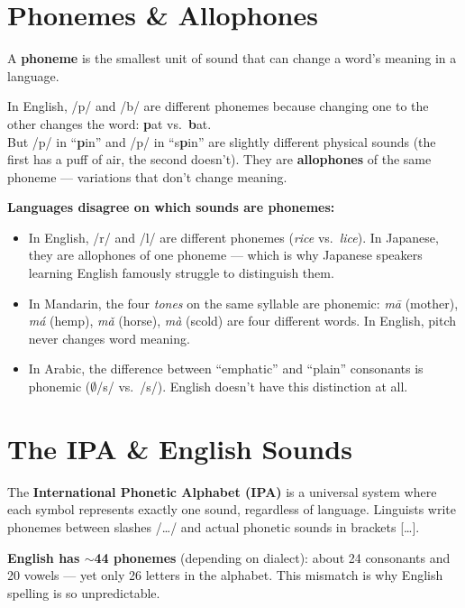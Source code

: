 \documentclass[11pt, letterpaper]{article}
\newcommand{\example}[1]{%
  \begin{tcolorbox}[colback=exbg, colframe=exborder,
    title={\bfseries Example}, arc=3pt, boxrule=1pt]
  #1
  \end{tcolorbox}%
}
\begin{document}
\vspace{8pt}

\section*{Phonemes \& Allophones}

A \textbf{phoneme} is the smallest unit of sound that can change a word's meaning in a language.

\example{
In English, /p/ and /b/ are different phonemes because changing one to the other changes the word: \textbf{p}at vs.\ \textbf{b}at.\\
But /p/ in ``\textbf{p}in'' and /p/ in ``s\textbf{p}in'' are slightly different physical sounds (the first has a puff of air, the second doesn't). They are \textbf{allophones} of the same phoneme --- variations that don't change meaning.
}

\textbf{Languages disagree on which sounds are phonemes:}
\begin{itemize}[noitemsep]
  \item In English, /r/ and /l/ are different phonemes (\emph{rice} vs.\ \emph{lice}). In Japanese, they are allophones of one phoneme --- which is why Japanese speakers learning English famously struggle to distinguish them.
  \item In Mandarin, the four \emph{tones} on the same syllable are phonemic: \emph{m\=a} (mother), \emph{m\'a} (hemp), \emph{m\v{a}} (horse), \emph{m\`a} (scold) are four different words. In English, pitch never changes word meaning.
  \item In Arabic, the difference between ``emphatic'' and ``plain'' consonants is phonemic ($\emptyset$/s/ vs.\ /s\textsubdot{}/). English doesn't have this distinction at all.
\end{itemize}

\section*{The IPA \& English Sounds}

The \textbf{International Phonetic Alphabet (IPA)} is a universal system where each symbol
represents exactly one sound, regardless of language. Linguists write phonemes between
slashes /\ldots/ and actual phonetic sounds in brackets [\ldots].

\textbf{English has $\sim$44 phonemes} (depending on dialect): about 24 consonants and 20 vowels --- yet only 26 letters in the alphabet. This mismatch is why English spelling is so unpredictable.
\end{document}
